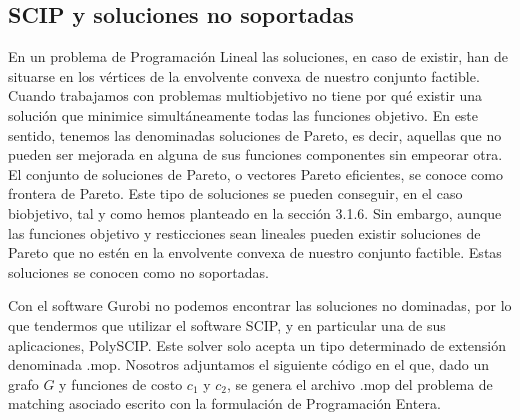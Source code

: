\documentclass[twoside,a4paper,openright,12pt,tikz]{book}
\begin{document}
\newpage
\subsection{SCIP y soluciones no soportadas}
En un problema de Programación Lineal las soluciones, en caso de existir, han de situarse en los vértices de la envolvente convexa de nuestro conjunto factible. Cuando trabajamos con problemas multiobjetivo no tiene por qué existir una solución que minimice simultáneamente todas las funciones objetivo. En este sentido, tenemos las denominadas soluciones de Pareto, es decir, aquellas que no pueden ser mejorada en alguna de sus funciones componentes sin empeorar otra. El conjunto de soluciones de Pareto, o vectores Pareto eficientes, se conoce como frontera de Pareto. Este tipo de soluciones se pueden conseguir, en el caso biobjetivo, tal y como hemos planteado en la sección 3.1.6. Sin embargo, aunque las funciones objetivo y resticciones sean lineales pueden existir soluciones de Pareto que no estén en la envolvente convexa de nuestro conjunto factible. Estas soluciones se conocen como no soportadas.

Con el software Gurobi no podemos encontrar las soluciones no dominadas, por lo que tendermos que utilizar el software SCIP, y en particular una de sus aplicaciones, PolySCIP. Este solver solo acepta un tipo determinado de extensión denominada .mop. Nosotros adjuntamos el siguiente código en el que, dado un grafo $G$ y funciones de costo $c_1$ y $c_2$, se genera el archivo .mop del problema de matching asociado escrito con la formulación de Programación Entera.
\end{document}

